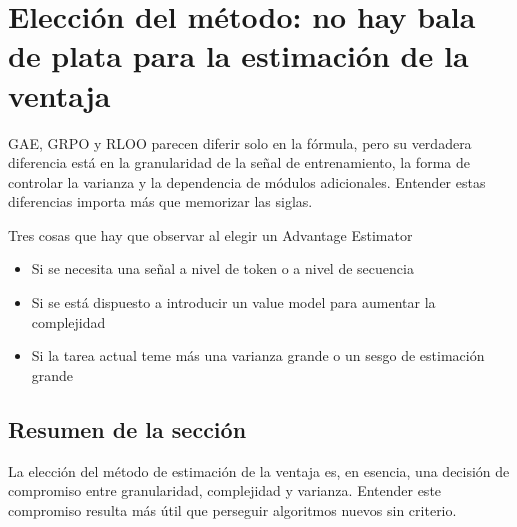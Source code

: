 \section{Elección del método: no hay bala de plata para la estimación de la ventaja}
GAE, GRPO y RLOO parecen diferir solo en la fórmula, pero su verdadera diferencia está en la granularidad de la señal de entrenamiento, la forma de controlar la varianza y la dependencia de módulos adicionales. Entender estas diferencias importa más que memorizar las siglas.

\begin{knowledgebox}{Tres cosas que hay que observar al elegir un Advantage Estimator}
\begin{itemize}
  \item Si se necesita una señal a nivel de token o a nivel de secuencia
  \item Si se está dispuesto a introducir un value model para aumentar la complejidad
  \item Si la tarea actual teme más una varianza grande o un sesgo de estimación grande
\end{itemize}
\end{knowledgebox}

\subsection{Resumen de la sección}
La elección del método de estimación de la ventaja es, en esencia, una decisión de compromiso entre granularidad, complejidad y varianza. Entender este compromiso resulta más útil que perseguir algoritmos nuevos sin criterio.

\newpage
